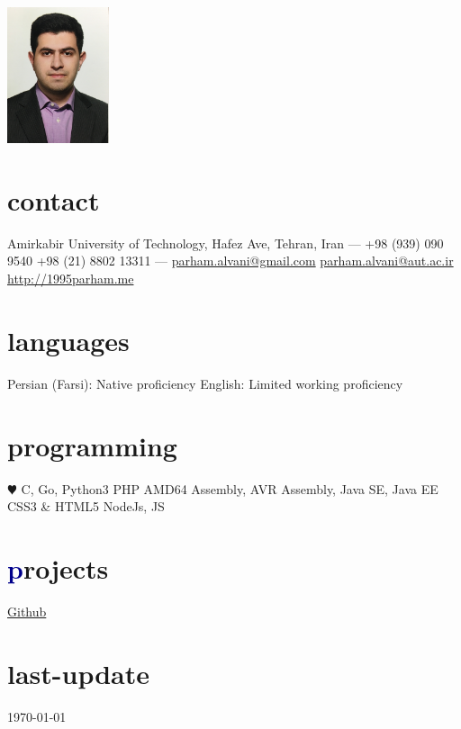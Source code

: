 \documentclass[]{friggeri-cv} %
\begin{document}


\begin{aside} %
	\includegraphics[width=3cm, height=4cm]{../parham_alvani_pers.jpg}
	\section{\textcolor{TextYellow}{c}ontact}
	Amirkabir University of Technology,
	Hafez Ave,
	Tehran, Iran
	---
	+98 (939) 090 9540
	+98 (21) 8802 13311
	---
	\href{mailto:parham.alvani@gmail.com}{parham.alvani@gmail.com}
	\href{mailto:parham.alvani@aut.ac.ir}{parham.alvani@aut.ac.ir}
	\href{http://1995parham.me/}{http://1995parham.me}
	\section{\textcolor{TextOrange}{l}anguages}
	Persian (Farsi):
	Native proficiency
	English:
	Limited working proficiency
	\section{\textcolor{TextGreen}{p}rogramming}
	{\color{red} $\varheartsuit$} C, Go, Python3
	PHP
	AMD64 Assembly,
	AVR Assembly,
	Java SE, Java EE
	CSS3 \& HTML5
	NodeJs, JS
	\section{\textcolor{DarkBlue}{p}rojects}
	\href{https://github.com/1995parham}{\textcolor{TextGreen}{\faGithub} Github}
	\section{\textcolor{Ocean}{last}-update}
	\today
\end{aside}
\end{document}
